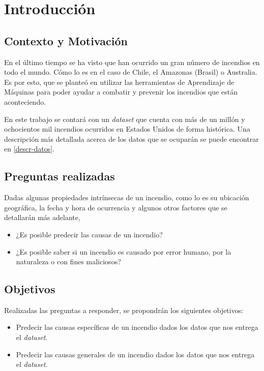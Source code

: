 \section{Introducción}


\subsection{Contexto y Motivación}
En el último tiempo se ha visto que han ocurrido un gran número de incendios en todo el mundo. Cómo lo es en el caso de Chile, el Amazonas (Brasil) o Australia. Es por esto, que se planteó en utilizar las herramientas de Aprendizaje de Máquinas para poder ayudar a combatir y prevenir los incendios que están aconteciendo.

En este trabajo se contará con un \textit{dataset} que cuenta con más de un millón y ochocientos mil incendios ocurridos en Estados Unidos de forma histórica. Una descripción más detallada acerca de los datos que se ocuparán se puede encontrar en \ref{descr-datos}.

\subsection{Preguntas realizadas}
Dadas algunas propiedades intrínsecas de un incendio, como lo es su ubicación geográfica, la fecha y hora de ocurrencia y algunos otros factores que se detallarán más adelante,
\begin{itemize}
    \item ¿Es posible predecir las causas de un incendio?
    \item ¿Es posible saber si un incendio es causado por error humano, por la naturaleza o con fines maliciosos?
\end{itemize}

\subsection{Objetivos}
Realizadas las preguntas a responder, se propondrán los siguientes objetivos:
\begin{itemize}
    \item Predecir las causas específicas de un incendio dados los datos que nos entrega el \textit{dataset}.
    \item Predecir las causas generales de un incendio dados los datos que nos entrega el \textit{dataset}.
\end{itemize}

